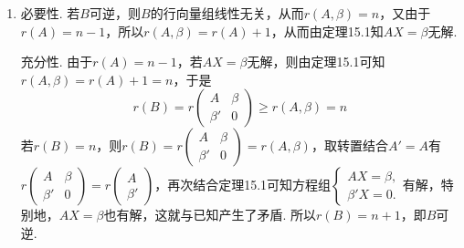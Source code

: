 \begin{enumerate}
\begin{enumerate}
              \item 必要性. 若$B$可逆，则$B$的行向量组线性无关，从而$r(A,\beta)=n$，又由于$r(A)=n-1$，所以$r(A,\beta)=r(A)+1$，从而由定理15.1知$AX=\beta$无解.

                    充分性. 由于$r(A)=n-1$，若$AX=\beta$无解，则由定理15.1可知$r(A,\beta)=r(A)+1=n$，于是
                    \[ r(B)=r\begin{pmatrix}
                            A      & \beta \\
                            \beta' & 0
                        \end{pmatrix}\geqslant r(A,\beta)=n \]
                    若$r(B)=n$，则$r(B)=r\begin{pmatrix}
                            A      & \beta \\
                            \beta' & 0
                        \end{pmatrix}=r(A,\beta)$，取转置结合$A'=A$有$r\begin{pmatrix}
                            A      & \beta \\
                            \beta' & 0
                        \end{pmatrix}=r\begin{pmatrix}
                            A \\
                            \beta'
                        \end{pmatrix}$，再次结合定理15.1可知方程组$\begin{cases}
                            AX=\beta, \\
                            \beta' X=0.
                        \end{cases}$有解，特别地，$AX=\beta$也有解，这就与已知产生了矛盾. 所以$r(B)=n+1$，即$B$可逆.
          \end{enumerate}


\end{enumerate}
